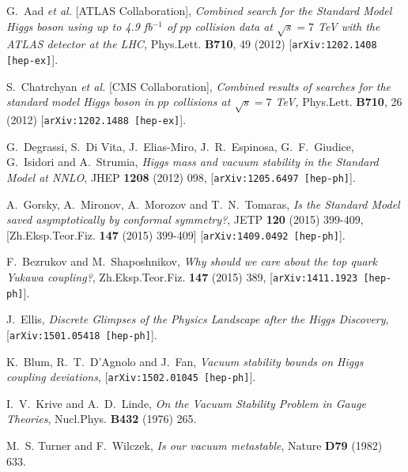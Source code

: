 \documentclass[aps,12pt,prd,superscriptaddress,preprintnumbers, 
	amssymb,
	amsmath,
	notitlepage,
	longbibliography,
	nofootinbib]{revtex4-1}
\begin{document}
\providecommand{\href}[2]{#2}
\begingroup\raggedright\begin{thebibliography}{10}


G.~Aad {\it et al.}  [ATLAS Collaboration],
{\it Combined search for the Standard Model Higgs boson 
using up to 4.9 fb$^{-1}$ of $pp$ collision data at $\sqrt{s}=7$ 
TeV with the ATLAS detector at the LHC,}
Phys.Lett. {\bf B710}, 49 (2012)
[\href{http://xxx.lanl.gov/abs/1202.1408}{{\tt arXiv:1202.1408 [hep-ex]}}].
 
S.~Chatrchyan {\it et al.}  [CMS Collaboration],
{\it Combined results of searches for the standard model 
Higgs boson in $pp$ collisions at $\sqrt{s}=7$ TeV,}
Phys.Lett. {\bf B710}, 26 (2012)
[\href{http://xxx.lanl.gov/abs/1202.1488}{{\tt arXiv:1202.1488 [hep-ex]}}].
  
G.~Degrassi, S.~Di Vita, J.~Elias-Miro, J.~R.~Espinosa, 
G.~F.~Giudice, G.~Isidori and A.~Strumia,
{\it {Higgs mass and vacuum stability in the Standard Model at NNLO}},  
JHEP {\bf 1208} (2012) 098,
[\href{http://xxx.lanl.gov/abs/1205.6497}{{\tt arXiv:1205.6497 [hep-ph]}}].

A.~Gorsky, A.~Mironov, A.~Morozov and T.~N.~Tomaras,
{\it {Is the Standard Model saved asymptotically by conformal symmetry?}},  
JETP {\bf 120} (2015) 399-409,
[Zh.Eksp.Teor.Fiz. {\bf 147} (2015) 399-409]
[\href{http://xxx.lanl.gov/abs/1409.0492}{{\tt arXiv:1409.0492 [hep-ph]}}].

F.~Bezrukov and M.~Shaposhnikov,
{\it {Why should we care about the top quark Yukawa coupling?}},  
Zh.Eksp.Teor.Fiz. {\bf 147} (2015) 389,
[\href{http://xxx.lanl.gov/abs/1411.1923}{{\tt arXiv:1411.1923 [hep-ph]}}].

J.~Ellis,
{\it Discrete Glimpses of the Physics Landscape after the Higgs Discovery},
[\href{http://xxx.lanl.gov/abs/1501.05418}{{\tt arXiv:1501.05418 [hep-ph]}}].
 
K.~Blum, R.~T.~D'Agnolo and J.~Fan,
{\it {Vacuum stability bounds on Higgs coupling deviations}},  
[\href{http://xxx.lanl.gov/abs/1502.01045}{{\tt arXiv:1502.01045 [hep-ph]}}].

I.~V.~Krive and A.~D.~Linde,
{\it {On the Vacuum Stability Problem in Gauge Theories}},  
Nucl.Phys. {\bf B432} (1976) 265.

M.~S. Turner and F.~Wilczek,
{\it {Is our vacuum metastable}},  
Nature {\bf D79} (1982) 633.


\end{thebibliography}
\end{document}
